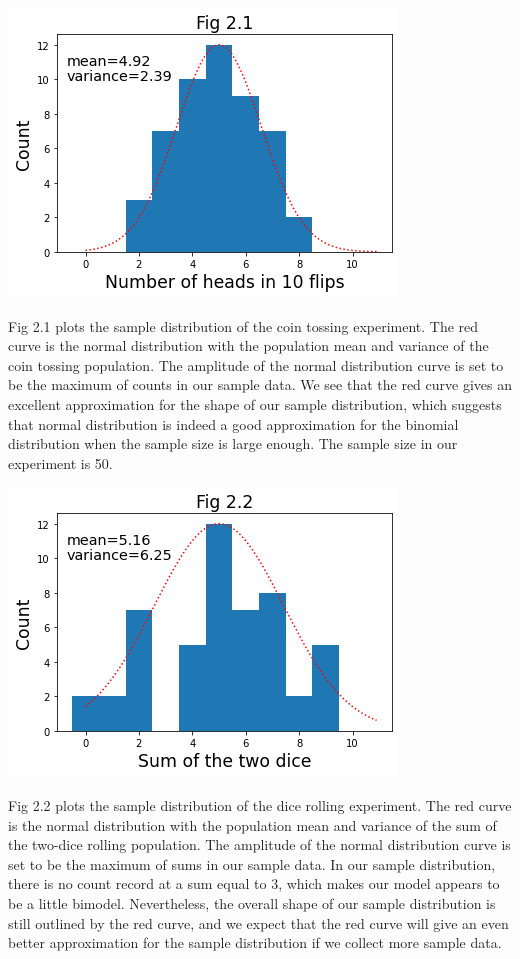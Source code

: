 \documentclass[11pt]{book}
\theoremstyle{break}
\theoremstyle{break}
\begin{document}
\begin{center}
\includegraphics[scale=0.5]{Fig2.1.png}
\end{center}
Fig 2.1 plots the sample distribution of the coin tossing experiment. The red curve is the normal distribution with the population mean and variance of the coin tossing population. The amplitude of the normal distribution curve is set to be the maximum of counts in our sample data. We see that the red curve gives an excellent approximation for the shape of our sample distribution, which suggests that normal distribution is indeed a good approximation for the binomial distribution when the sample size is large enough. The sample size in our experiment is 50.
\hfill\break
\begin{center}
\includegraphics[scale=0.5]{Fig2.2.png}
\end{center}
Fig 2.2 plots the sample distribution of the dice rolling experiment. The red curve is the normal distribution with the population mean and variance of the sum of the two-dice rolling population. The amplitude of the normal distribution curve is set to be the maximum of sums in our sample data. In our sample distribution, there is no count record at a sum equal to 3, which makes our model appears to be a little bimodel. Nevertheless, the overall shape of our sample distribution is still outlined by the red curve, and we expect that the red curve will give an even better approximation for the sample distribution if we collect more sample data.\\
\end{document}
